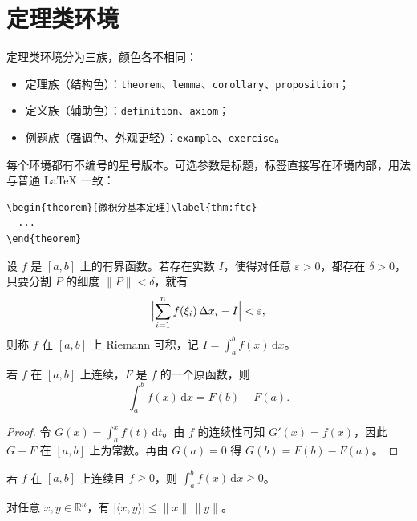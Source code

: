 \documentclass[lang=cn, theme=blue, thmstyle=fancy, twoside]{mingbook}
\begin{document}
\section{定理类环境}

定理类环境分为三族，颜色各不相同：
\begin{itemize}
  \item 定理族（结构色）：\texttt{theorem}、\texttt{lemma}、\texttt{corollary}、\texttt{proposition}；
  \item 定义族（辅助色）：\texttt{definition}、\texttt{axiom}；
  \item 例题族（强调色、外观更轻）：\texttt{example}、\texttt{exercise}。
\end{itemize}
每个环境都有不编号的星号版本。可选参数是标题，标签直接写在环境内部，用法与普通 \LaTeX{} 一致：
\begin{verbatim}
\begin{theorem}[微积分基本定理]\label{thm:ftc}
  ...
\end{theorem}
\end{verbatim}

\begin{definition}[Riemann 可积]\label{def:riemann}
设 $f$ 是 $[a,b]$ 上的有界函数。若存在实数 $I$，使得对任意 $\varepsilon>0$，都存在 $\delta>0$，只要分割 $P$ 的细度 $\lVert P\rVert<\delta$，就有
\[
  \Bigl\lvert \sum_{i=1}^{n} f(\xi_i)\,\Delta x_i - I \Bigr\rvert < \varepsilon ,
\]
则称 $f$ 在 $[a,b]$ 上 Riemann 可积，记 $I=\int_a^b f(x)\,\mathrm{d}x$。
\end{definition}

\begin{theorem}[微积分基本定理]\label{thm:ftc}
若 $f$ 在 $[a,b]$ 上连续，$F$ 是 $f$ 的一个原函数，则
\begin{equation}\label{eq:ftc}
  \int_a^b f(x)\,\mathrm{d}x = F(b)-F(a).
\end{equation}
\end{theorem}

\begin{proof}
令 $G(x)=\int_a^x f(t)\,\mathrm{d}t$。由 $f$ 的连续性可知 $G'(x)=f(x)$，因此 $G-F$ 在 $[a,b]$ 上为常数。再由 $G(a)=0$ 得 $G(b)=F(b)-F(a)$。
\end{proof}

\begin{corollary}
若 $f$ 在 $[a,b]$ 上连续且 $f\ge 0$，则 $\int_a^b f(x)\,\mathrm{d}x \ge 0$。
\end{corollary}

\begin{lemma}
对任意 $x,y\in\mathbb{R}^n$，有 $\lvert\langle x,y\rangle\rvert \le \lVert x\rVert\,\lVert y\rVert$。
\end{lemma}
\end{document}
